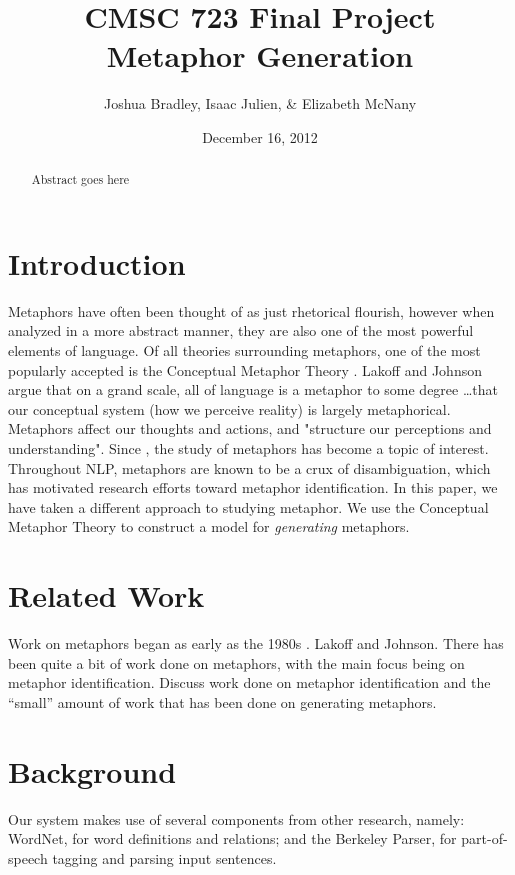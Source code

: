 \documentclass[12pt]{article}
\title{CMSC 723 Final Project\\
Metaphor Generation}
\author{Joshua Bradley, Isaac Julien, \& Elizabeth McNany}
\date{December 16, 2012}
\begin{document}
\maketitle

\begin{abstract}
Abstract goes here
\end{abstract}

\newpage
\tableofcontents
\newpage

\section{Introduction}

Metaphors have often been thought of as just rhetorical flourish, however when analyzed in a more abstract manner, they are also one of the most powerful elements of language. Of all theories surrounding metaphors, one of the most popularly accepted is the Conceptual Metaphor Theory \cite{lakoff80}. Lakoff and Johnson argue that on a grand scale, all of language is a metaphor to some degree \ldots that our conceptual system (how we perceive reality) is largely metaphorical. Metaphors affect our thoughts and actions, and "structure our perceptions and understanding". Since \cite{lakoff80}, the study of metaphors has become a topic of interest. Throughout NLP, metaphors are known to be a crux of disambiguation, which has motivated research efforts toward metaphor identification. In this paper, we have taken a different approach to studying metaphor. We use the Conceptual Metaphor Theory to construct a model for \emph{generating} metaphors.

\section{Related Work}

Work on metaphors began as early as the 1980s \cite{lakoff80}. Lakoff and Johnson. There has been quite a bit of work done on metaphors, with the main focus being on metaphor identification. Discuss work done on metaphor identification and the ``small'' amount of work that has been done on generating metaphors.

\section{Background}

Our system makes use of several components from other research, namely: WordNet, for word definitions and relations; and the Berkeley Parser, for part-of-speech tagging and parsing input sentences.
\end{document}
